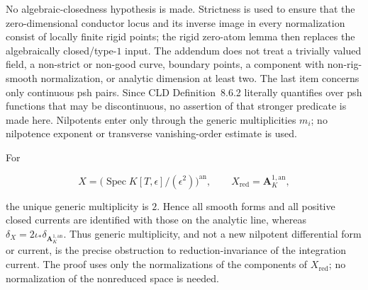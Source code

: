 \begin{remark}
\label{rem:p21p3-nr-scope}
No algebraic-closedness hypothesis is made.  Strictness is used
to ensure that the zero-dimensional conductor locus and its inverse image
in every normalization consist of locally finite rigid points; the rigid
zero-atom lemma then replaces the algebraically closed/type-\(1\) input.
The addendum does not treat a trivially valued field, a non-strict or
non-good curve, boundary points, a component with non-rig-smooth
normalization, or analytic dimension at least two.  The last item concerns
only continuous psh pairs.  Since CLD Definition~8.6.2 literally
quantifies over psh functions that may be discontinuous, no assertion of
that stronger predicate is made here.  Nilpotents enter only through the
generic multiplicities \(m_i\); no nilpotence exponent or transverse
vanishing-order estimate is used.
\end{remark}

\begin{remark}
\label{rem:p21p3-nr-double-line}
For

\[
 X=\bigl(\operatorname{Spec}K[T,\epsilon]/(\epsilon^2)\bigr)^{\mathrm{an}},
 \qquad X_{\mathrm{red}}=\mathbf A_K^{1,\mathrm{an}},
\]

the unique generic multiplicity is \(2\).  Hence all smooth forms and all
positive closed currents are identified with those on the analytic line,
whereas
\(\delta_X=2\iota_*\delta_{\mathbf A_K^{1,\mathrm{an}}}\).
Thus generic multiplicity, and not a new nilpotent differential form or
current, is the precise obstruction to reduction-invariance of the
integration current.  The proof uses only the normalizations of the
components of \(X_{\mathrm{red}}\); no normalization of the nonreduced
space is needed.
\end{remark}
